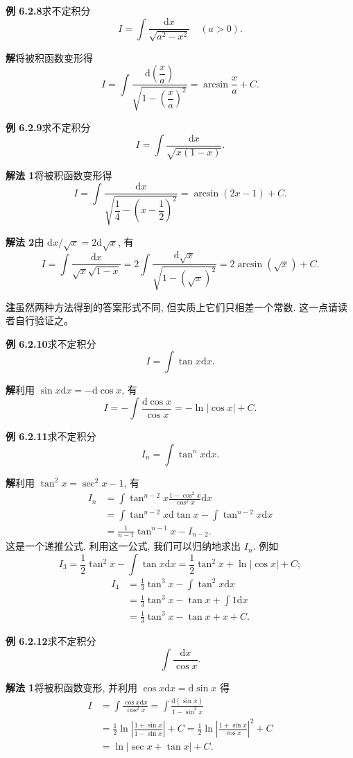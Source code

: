 \documentclass[UTF8,12pt,a4paper,fontset=fandol]{ctexart}
\begin{document}
\noindent\textbf{例 6.2.8}\quad 求不定积分
\[
  I=\int\frac{\mathrm dx}{\sqrt{a^2-x^2}}\quad (a>0).
\]

\noindent\textbf{解}\quad 将被积函数变形得
\[
  I=
  \int\frac{\mathrm d\left(\dfrac xa\right)}
  {\sqrt{1-\left(\dfrac xa\right)^2}}
  =
  \arcsin\frac xa+C.
\]

\noindent\textbf{例 6.2.9}\quad 求不定积分
\[
  I=\int\frac{\mathrm dx}{\sqrt{x(1-x)}}.
\]

\noindent\textbf{解法 1}\quad 将被积函数变形得
\[
  I=
  \int\frac{\mathrm dx}{\sqrt{\dfrac14-\left(x-\dfrac12\right)^2}}
  =
  \arcsin(2x-1)+C.
\]

\noindent\textbf{解法 2}\quad 由 $\mathrm dx/\sqrt x=2\mathrm d\sqrt x$, 有
\[
  I=
  \int\frac{\mathrm dx}{\sqrt x\sqrt{1-x}}
  =
  2\int\frac{\mathrm d\sqrt x}{\sqrt{1-(\sqrt x)^2}}
  =
  2\arcsin(\sqrt x)+C.
\]

\noindent\textbf{注}\quad 虽然两种方法得到的答案形式不同, 但实质上它们只相差一个常数. 这一点请读者自行验证之。

\noindent\textbf{例 6.2.10}\quad 求不定积分
\[
  I=\int\tan x\mathrm dx.
\]

\noindent\textbf{解}\quad 利用 $\sin x\mathrm dx=-\mathrm d\cos x$, 有
\[
  I=-\int\frac{\mathrm d\cos x}{\cos x}
  =
  -\ln|\cos x|+C.
\]

\noindent\textbf{例 6.2.11}\quad 求不定积分
\[
  I_n=\int\tan^nx\mathrm dx.
\]

\noindent\textbf{解}\quad 利用 $\tan^2x=\sec^2x-1$, 有
\[
\begin{aligned}
  I_n
  &=
  \int\tan^{n-2}x\frac{1-\cos^2x}{\cos^2x}\mathrm dx\\
  &=
  \int\tan^{n-2}x\mathrm d\tan x-\int\tan^{n-2}x\mathrm dx\\
  &=
  \frac1{n-1}\tan^{n-1}x-I_{n-2}.
\end{aligned}
\]
这是一个递推公式. 利用这一公式, 我们可以归纳地求出 $I_n$. 例如
\[
  I_3=\frac12\tan^2x-\int\tan x\mathrm dx
  =
  \frac12\tan^2x+\ln|\cos x|+C;
\]
\[
\begin{aligned}
  I_4
  &=
  \frac13\tan^3x-\int\tan^2x\mathrm dx\\
  &=
  \frac13\tan^3x-\tan x+\int1\mathrm dx\\
  &=
  \frac13\tan^3x-\tan x+x+C.
\end{aligned}
\]

\noindent\textbf{例 6.2.12}\quad 求不定积分
\[
  \int\frac{\mathrm dx}{\cos x}.
\]

\noindent\textbf{解法 1}\quad 将被积函数变形, 并利用 $\cos x\mathrm dx=\mathrm d\sin x$ 得
\[
\begin{aligned}
  I
  &=
  \int\frac{\cos x\mathrm dx}{\cos^2x}
  =
  \int\frac{\mathrm d(\sin x)}{1-\sin^2x}\\
  &=
  \frac12\ln\left|\frac{1+\sin x}{1-\sin x}\right|+C
  =
  \frac12\ln\left|\frac{1+\sin x}{\cos x}\right|^2+C\\
  &=
  \ln|\sec x+\tan x|+C.
\end{aligned}
\]
\end{document}
